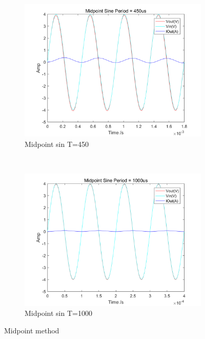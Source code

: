 \documentclass[a4paper, 12pt]{article}
\begin{document}
\begin{figure}[h]
\begin{subfigure}[b]{0.4\textwidth}
            \includegraphics[width=\textwidth]{ex1/midpoint_mid_sin_450.png}
            \caption{Midpoint sin T=450}
      \end{subfigure}
       ~
      \begin{subfigure}[b]{0.4\textwidth}
            \includegraphics[width=\textwidth]{ex1/midpoint_mid_sin_1000.png}
            \caption{Midpoint sin T=1000}
      \end{subfigure}
      \caption{Midpoint method}
\end{figure}
\newpage
\end{document}
